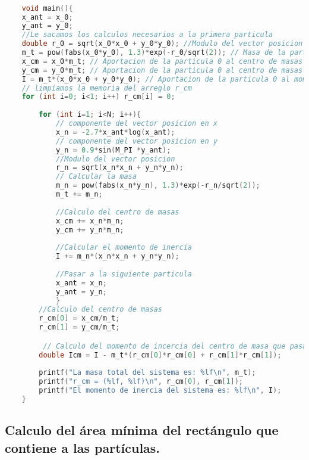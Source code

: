 \documentclass[12pt]{article}
\begin{document}
\begin{lstlisting}[language=C, caption={Calculo del centro de masa y el momento de inercia.}, style=mystyle]

    void main(){
    x_ant = x_0;
    y_ant = y_0;
    //Le sacamos los calculos necesarios a la primera particula
    double r_0 = sqrt(x_0*x_0 + y_0*y_0); //Modulo del vector posicion
    m_t = pow(fabs(x_0*y_0), 1.3)*exp(-r_0/sqrt(2)); // Masa de la particula 0
    x_cm = x_0*m_t; // Aportacion de la particula 0 al centro de masas
    y_cm = y_0*m_t; // Aportacion de la particula 0 al centro de masas
    I = m_t*(x_0*x_0 + y_0*y_0); // Aportacion de la particula 0 al momento de inercia
    // limpiamos la memoria del arreglo r_cm
    for (int i=0; i<1; i++) r_cm[i] = 0;
        
        for (int i=1; i<N; i++){
            // componente del vector posicion en x
            x_n = -2.7*x_ant*log(x_ant);
            // componente del vector posicion en y
            y_n = 0.9*sin(M_PI *y_ant);
            //Modulo del vector posicion
            r_n = sqrt(x_n*x_n + y_n*y_n);
            // Calcular la masa
            m_n = pow(fabs(x_n*y_n), 1.3)*exp(-r_n/sqrt(2));
            m_t += m_n;
        
            //Calculo del centro de masas
            x_cm += x_n*m_n;
            y_cm += y_n*m_n;
        
            //Calcular el momento de inercia
            I += m_n*(x_n*x_n + y_n*y_n);
            
            //Pasar a la siguiente particula
            x_ant = x_n;
            y_ant = y_n;
            }
        //Calculo del centro de masas
        r_cm[0] = x_cm/m_t;
        r_cm[1] = y_cm/m_t;

         // Calculo del momento de incercia del centro de masa que pasa por el centro de masa usando el teorema de Steiner.
        double Icm = I - m_t*(r_cm[0]*r_cm[0] + r_cm[1]*r_cm[1]);
        
        printf("La masa total del sistema es: %lf\n", m_t);
        printf("r_cm = (%lf, %lf)\n", r_cm[0], r_cm[1]);
        printf("El momento de inercia del sistema es: %lf\n", I); 
    }
    \end{lstlisting}

\subsection{Calculo del área mínima del rectángulo que contiene a las partículas.}
\end{document}
